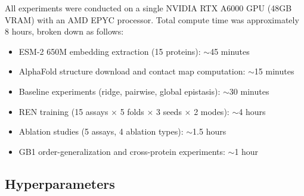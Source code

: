 \documentclass{article}
\begin{document}
All experiments were conducted on a single NVIDIA RTX A6000 GPU (48GB VRAM) with an AMD EPYC processor. Total compute time was approximately 8 hours, broken down as follows:

\begin{itemize}
    \item ESM-2 650M embedding extraction (15 proteins): $\sim$45 minutes
    \item AlphaFold structure download and contact map computation: $\sim$15 minutes
    \item Baseline experiments (ridge, pairwise, global epistasis): $\sim$30 minutes
    \item REN training (15 assays $\times$ 5 folds $\times$ 3 seeds $\times$ 2 modes): $\sim$4 hours
    \item Ablation studies (5 assays, 4 ablation types): $\sim$1.5 hours
    \item GB1 order-generalization and cross-protein experiments: $\sim$1 hour
\end{itemize}

\subsection{Hyperparameters}
\end{document}
